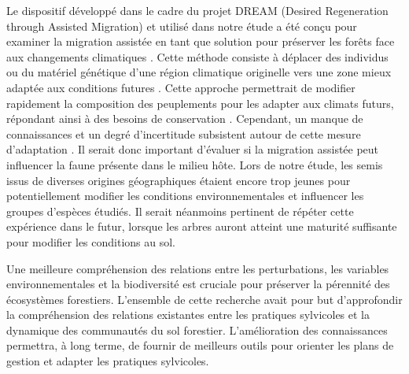 Le dispositif développé dans le cadre du projet DREAM (Desired Regeneration through Assisted Migration) et utilisé dans notre étude a été conçu pour examiner la migration assistée en tant que solution pour préserver les forêts face aux changements climatiques \citep{royoDesiredREgenerationAssisted2023}. 
Cette méthode consiste à déplacer des individus ou du matériel génétique d’une région climatique originelle vers une zone mieux adaptée aux conditions futures \citep{Vitt2010Assistedmigration}. 
Cette approche permettrait de modifier rapidement la composition des peuplements pour les adapter aux climats futurs, répondant ainsi à des besoins de conservation \citep{Dumroese2015Considerationsrestoring,Park2018Informationunderload,Park2023Provenancetrials}. 
Cependant, un manque de connaissances et un degré d’incertitude subsistent autour de cette mesure d’adaptation \citep{Klenk2015assistedmigration,Park2018Informationunderload}. 
Il serait donc important d’évaluer si la migration assistée peut influencer la faune présente dans le milieu hôte.
Lors de notre étude, les semis issus de diverses origines géographiques étaient encore trop jeunes pour potentiellement modifier les conditions environnementales et influencer les groupes d’espèces étudiés. 
Il serait néanmoins pertinent de répéter cette expérience dans le futur, lorsque les arbres auront atteint une maturité suffisante pour modifier les conditions au sol. 

Une meilleure compréhension des relations entre les perturbations, les variables environnementales et la biodiversité est cruciale pour préserver la pérennité des écosystèmes forestiers. 
L’ensemble de cette recherche avait pour but d'approfondir la compréhension des relations existantes entre les pratiques sylvicoles et la dynamique des communautés du sol forestier. 
L'amélioration des connaissances permettra, à long terme, de fournir de meilleurs outils pour orienter les plans de gestion et adapter les pratiques sylvicoles.


\cleardoublepage




